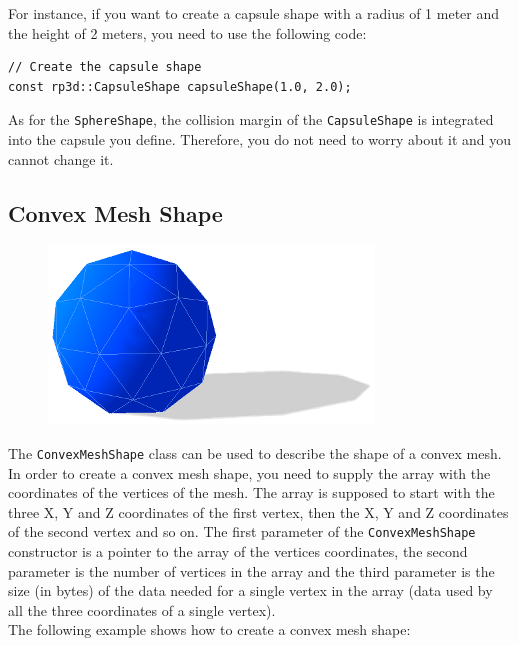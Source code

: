 \documentclass[a4paper,12pt]{article}
\begin{document}
    For instance, if you want to create a capsule shape with a radius of 1 meter and the height of 2 meters, you need to use the following code: \\

    \begin{lstlisting}
// Create the capsule shape
const rp3d::CapsuleShape capsuleShape(1.0, 2.0);
  \end{lstlisting}

    \vspace{0.6cm}

    As for the \texttt{SphereShape}, the collision margin of the \texttt{CapsuleShape} is integrated into the capsule you define.
    Therefore, you do not need to worry about it and you cannot change it.

    \subsection{Convex Mesh Shape}

    \begin{figure}[h]
        \centering
        \includegraphics{convexshape.png}
        \label{fig:convexshape}
    \end{figure}

    The \texttt{ConvexMeshShape} class can be used to describe the shape of a convex mesh. In order to create a convex mesh shape, you need to supply the array with the coordinates of
    the vertices of the mesh. The array is supposed to start with the three X, Y and Z coordinates of the first vertex, then the X, Y and Z coordinates of the second vertex and so on.
    The first parameter of the \texttt{ConvexMeshShape} constructor is a pointer to the array of the vertices coordinates, the second parameter is the number of vertices in the array and
    the third parameter is the size (in bytes) of the data needed for a single vertex in the array (data used by all the three coordinates of a single vertex). \\

    The following example shows how to create a convex mesh shape: \\
\end{document}
